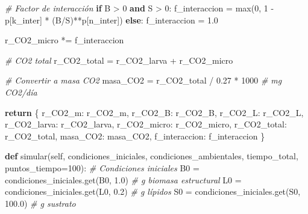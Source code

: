 \documentclass[
]{article}
\newenvironment{Shaded}{}{}
\newcommand{\BuiltInTok}[1]{\textcolor[rgb]{0.00,0.50,0.00}{#1}}
\newcommand{\CommentTok}[1]{\textcolor[rgb]{0.38,0.63,0.69}{\textit{#1}}}
\newcommand{\ControlFlowTok}[1]{\textcolor[rgb]{0.00,0.44,0.13}{\textbf{#1}}}
\newcommand{\DecValTok}[1]{\textcolor[rgb]{0.25,0.63,0.44}{#1}}
\newcommand{\FloatTok}[1]{\textcolor[rgb]{0.25,0.63,0.44}{#1}}
\newcommand{\KeywordTok}[1]{\textcolor[rgb]{0.00,0.44,0.13}{\textbf{#1}}}
\newcommand{\NormalTok}[1]{#1}
\newcommand{\OperatorTok}[1]{\textcolor[rgb]{0.40,0.40,0.40}{#1}}
\newcommand{\StringTok}[1]{\textcolor[rgb]{0.25,0.44,0.63}{#1}}
\newcommand{\VariableTok}[1]{\textcolor[rgb]{0.10,0.09,0.49}{#1}}
\begin{document}
\begin{Shaded}
\begin{Highlighting}[]
        \CommentTok{\# Factor de interacción}
        \ControlFlowTok{if}\NormalTok{ B }\OperatorTok{\textgreater{}} \DecValTok{0} \KeywordTok{and}\NormalTok{ S }\OperatorTok{\textgreater{}} \DecValTok{0}\NormalTok{:}
\NormalTok{            f\_interaccion }\OperatorTok{=} \BuiltInTok{max}\NormalTok{(}\DecValTok{0}\NormalTok{, }\DecValTok{1} \OperatorTok{{-}}\NormalTok{ p[}\StringTok{\textquotesingle{}k\_inter\textquotesingle{}}\NormalTok{] }\OperatorTok{*}\NormalTok{ (B}\OperatorTok{/}\NormalTok{S)}\OperatorTok{**}\NormalTok{p[}\StringTok{\textquotesingle{}n\_inter\textquotesingle{}}\NormalTok{])}
        \ControlFlowTok{else}\NormalTok{:}
\NormalTok{            f\_interaccion }\OperatorTok{=} \FloatTok{1.0}
            
\NormalTok{        r\_CO2\_micro }\OperatorTok{*=}\NormalTok{ f\_interaccion}
        
        \CommentTok{\# CO2 total}
\NormalTok{        r\_CO2\_total }\OperatorTok{=}\NormalTok{ r\_CO2\_larva }\OperatorTok{+}\NormalTok{ r\_CO2\_micro}
        
        \CommentTok{\# Convertir a masa CO2}
\NormalTok{        masa\_CO2 }\OperatorTok{=}\NormalTok{ r\_CO2\_total }\OperatorTok{/} \FloatTok{0.27} \OperatorTok{*} \DecValTok{1000}  \CommentTok{\# mg CO2/día}
        
        \ControlFlowTok{return}\NormalTok{ \{}
            \StringTok{\textquotesingle{}r\_CO2\_m\textquotesingle{}}\NormalTok{: r\_CO2\_m,}
            \StringTok{\textquotesingle{}r\_CO2\_B\textquotesingle{}}\NormalTok{: r\_CO2\_B,}
            \StringTok{\textquotesingle{}r\_CO2\_L\textquotesingle{}}\NormalTok{: r\_CO2\_L,}
            \StringTok{\textquotesingle{}r\_CO2\_larva\textquotesingle{}}\NormalTok{: r\_CO2\_larva,}
            \StringTok{\textquotesingle{}r\_CO2\_micro\textquotesingle{}}\NormalTok{: r\_CO2\_micro,}
            \StringTok{\textquotesingle{}r\_CO2\_total\textquotesingle{}}\NormalTok{: r\_CO2\_total,}
            \StringTok{\textquotesingle{}masa\_CO2\textquotesingle{}}\NormalTok{: masa\_CO2,}
            \StringTok{\textquotesingle{}f\_interaccion\textquotesingle{}}\NormalTok{: f\_interaccion}
\NormalTok{        \}}
    
    \KeywordTok{def}\NormalTok{ simular(}\VariableTok{self}\NormalTok{, condiciones\_iniciales, condiciones\_ambientales, tiempo\_total, puntos\_tiempo}\OperatorTok{=}\DecValTok{100}\NormalTok{):}
        \CommentTok{\# Condiciones iniciales}
\NormalTok{        B0 }\OperatorTok{=}\NormalTok{ condiciones\_iniciales.get(}\StringTok{\textquotesingle{}B0\textquotesingle{}}\NormalTok{, }\FloatTok{1.0}\NormalTok{)      }\CommentTok{\# g biomasa estructural}
\NormalTok{        L0 }\OperatorTok{=}\NormalTok{ condiciones\_iniciales.get(}\StringTok{\textquotesingle{}L0\textquotesingle{}}\NormalTok{, }\FloatTok{0.2}\NormalTok{)      }\CommentTok{\# g lípidos}
\NormalTok{        S0 }\OperatorTok{=}\NormalTok{ condiciones\_iniciales.get(}\StringTok{\textquotesingle{}S0\textquotesingle{}}\NormalTok{, }\FloatTok{100.0}\NormalTok{)    }\CommentTok{\# g sustrato}
        

\end{Highlighting}
\end{Shaded}
\end{document}

